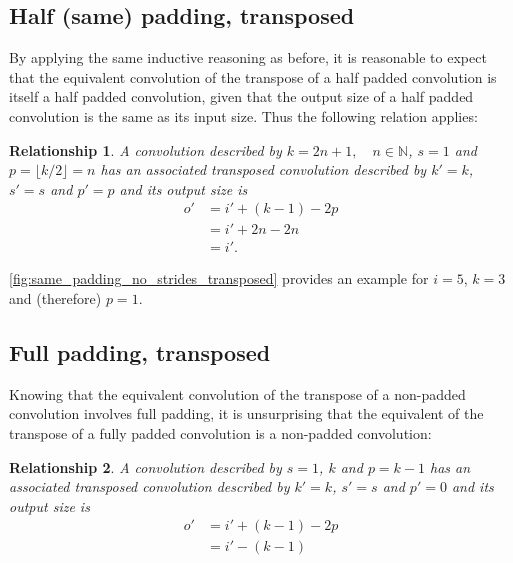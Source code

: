 \documentclass[notitlepage]{report}
\newtheorem{relationship}{Relationship}
\begin{document}
\subsection{Half (same) padding, transposed}

By applying the same inductive reasoning as before, it is reasonable to expect
that the equivalent convolution of the transpose of a half padded convolution
is itself a half padded convolution, given that the output size of a half
padded convolution is the same as its input size. Thus the following relation
applies:

\begin{relationship}\label{rel:half_padding_no_strides_transposed}
A convolution described by $k = 2n + 1, \quad n \in \mathbb{N}$, $s = 1$ and $p
= \lfloor k / 2 \rfloor = n$ has an associated transposed convolution described
by $k' = k$, $s' = s$ and $p' = p$ and its output size is
\begin{equation*}
\begin{split}
    o' &= i' + (k - 1) - 2p \\
       &= i' + 2n - 2n \\
       &= i'.
\end{split}
\end{equation*}
\end{relationship}

\autoref{fig:same_padding_no_strides_transposed} provides an example for $i =
5$, $k = 3$ and (therefore) $p = 1$.

\subsection{Full padding, transposed}

Knowing that the equivalent convolution of the transpose of a non-padded
convolution involves full padding, it is unsurprising that the equivalent of
the transpose of a fully padded convolution is a non-padded convolution:

\begin{relationship}\label{rel:full_padding_no_strides_transposed}
A convolution described by $s = 1$, $k$ and $p = k - 1$ has an
associated transposed convolution described by $k' = k$, $s' = s$ and $p' = 0$
and its output size is
\begin{equation*}
\begin{split}
    o' &= i' + (k - 1) - 2p \\
       &= i' - (k - 1)
\end{split}
\end{equation*}
\end{relationship}
\end{document}
